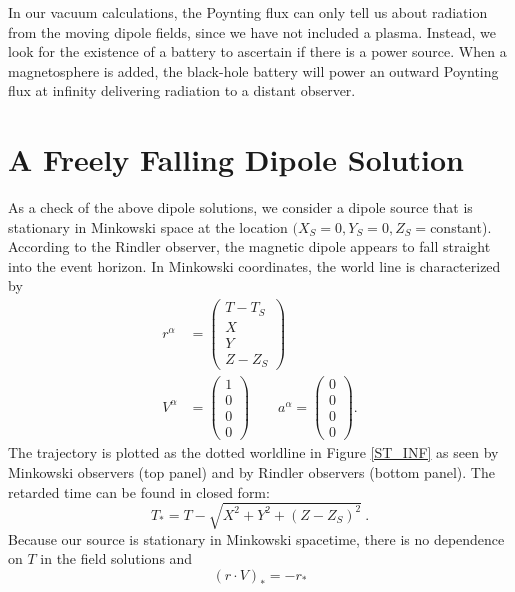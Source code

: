 In our vacuum calculations, the
Poynting flux can only tell us about radiation from the moving
dipole fields, since we have not included a plasma. 
Instead, we look for the existence of
a battery to ascertain if there is a power source. When
a magnetosphere is added, the black-hole battery will power an outward
Poynting flux at infinity delivering radiation to a distant observer.






\section{A Freely Falling Dipole Solution}
\label{A Freely Falling Dipole Solution}
As a check of the above dipole solutions, we consider a dipole source
that is stationary in Minkowski space at the location
$(X_S=0,Y_S=0,Z_S=$constant).
According to the Rindler observer, the magnetic dipole appears to fall
straight into the event horizon.
In Minkowski coordinates, the world line is characterized by
\begin{align}
r^{\alpha} &= \nonumber
\begin{pmatrix}
 T-T_S  \\
X  \\
Y  \\
Z-Z_S
\end{pmatrix}   \\
V^{\alpha}  &=
\begin{pmatrix}
 1 \\
0  \\
0 \\
0
\end{pmatrix}\qquad
a^{\alpha}  =
\begin{pmatrix}
0  \\
0  \\
0 \\
0 \label{Eq:InF_rva}
\end{pmatrix} .
\end{align}
The trajectory is plotted as the dotted worldline in Figure \ref{ST_INF}
 as seen by Minkowski observers (top panel) and by Rindler 
 observers (bottom panel). The retarded time can be found in closed form:
\begin{equation}
T_*=T-\sqrt{X^2+Y^2+(Z-Z_S)^2}\nonumber \ .
\end{equation}
Because our source is stationary in Minkowski spacetime,
there is no dependence on $T$ in the field solutions and 
\begin{equation}
\left(r \cdot V\right)_*=  - r_*
\end{equation}

